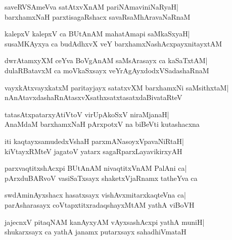 \documentclass[twoside,12pt,openright]{book}
\newcounter{shloka}[chapter]
\begin{document}
\begin{shloka}%
saveRVSAmeVva satAtxvXnAM pariNAmaviniNaRyaH|\\
barxhamxNaH parxtisagaRshacx savaRsaMhAravaNaRnaM
\end{shloka}

\begin{shloka}%
kalepxV kalepxV ca BUtAnAM mahatAmapi saMkaSxyaH|\\
susaMKAyxya ca budAdhxvX veY barxhamxNashAcxpayxnitayxtAM
\end{shloka}

\begin{shloka}%
dwrAtamxyXM ceYva BoVgAnAM saMsArasayx ca kaSaTxtAM|\\
dulaRBatavxM ca moVkaSxsayx veYrAgAyxdodxVSadashaRnaM
\end{shloka}

\begin{shloka}%
vayxkAtxvayxkatxM paritayjayx satatxvXM barxhamxNi saMsithxtaM|\\
nAnAtavxdashaRnAtasxvXsathxsatxtasatxdaBivataRteV
\end{shloka}

\begin{shloka}%
tatasAtxpatarxyAtiVtoV virUpAkoSxV niraMjanaH|\\
AnaMdaM barxhamxNaH pArxpotxV na biBeVti kutashacxna
\end{shloka}

\begin{shloka}%
iti kaqtayxsamudedxVshaH parxmANasoyxVpavaNiRtaH|\\
kiVtayxRMteV jagatoV yatarx sagaRparxLayavikirxyAH
\end{shloka}

\begin{shloka}%
parxvaqtitxshAcxpi BUtAnAM nivaqtitxVnAM PalAni ca|\\
pArxduBARvoV vasiSaTxsayx shaketxVjaRnamx tatheYva ca
\end{shloka}


\begin{shloka}%
swdAminAyxshacx hasatxsayx vishAvxmitarxkaqteVna ca|\\
parAsharasayx coVtapxtitxradaqshayxMtAM yathA viBoVH
\end{shloka}

\begin{shloka}%
jajecnxV pitaqNAM kanAyxyAM vAyxsashAcxpi yathA muniH|\\
shukarxsayx ca yathA janamx putarxsayx sahadhiVmataH
\end{shloka}
\end{document}
